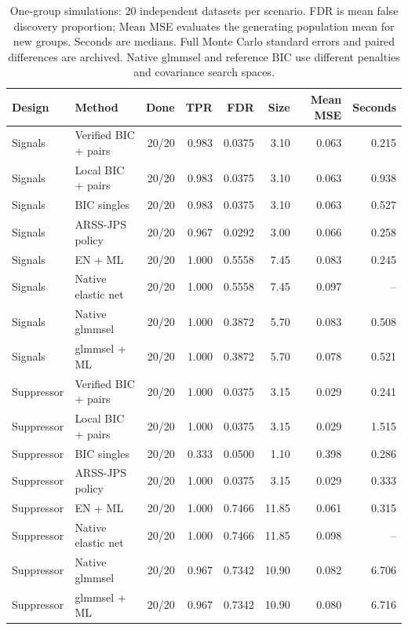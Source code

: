 \begin{table}[H]\centering\small
\begin{tabular}{llrrrrrr}\toprule
Design & Method & Done & TPR & FDR & Size & Mean MSE & Seconds\\\midrule
Signals & Verified BIC + pairs & 20/20 & 0.983 & 0.0375 & 3.10 & 0.063 & 0.215\\
Signals & Local BIC + pairs & 20/20 & 0.983 & 0.0375 & 3.10 & 0.063 & 0.938\\
Signals & BIC singles & 20/20 & 0.983 & 0.0375 & 3.10 & 0.063 & 0.527\\
Signals & ARSS-JPS policy & 20/20 & 0.967 & 0.0292 & 3.00 & 0.066 & 0.258\\
Signals & EN + ML & 20/20 & 1.000 & 0.5558 & 7.45 & 0.083 & 0.245\\
Signals & Native elastic net & 20/20 & 1.000 & 0.5558 & 7.45 & 0.097 & --\\
Signals & Native glmmsel & 20/20 & 1.000 & 0.3872 & 5.70 & 0.083 & 0.508\\
Signals & glmmsel + ML & 20/20 & 1.000 & 0.3872 & 5.70 & 0.078 & 0.521\\
\midrule
Suppressor & Verified BIC + pairs & 20/20 & 1.000 & 0.0375 & 3.15 & 0.029 & 0.241\\
Suppressor & Local BIC + pairs & 20/20 & 1.000 & 0.0375 & 3.15 & 0.029 & 1.515\\
Suppressor & BIC singles & 20/20 & 0.333 & 0.0500 & 1.10 & 0.398 & 0.286\\
Suppressor & ARSS-JPS policy & 20/20 & 1.000 & 0.0375 & 3.15 & 0.029 & 0.333\\
Suppressor & EN + ML & 20/20 & 1.000 & 0.7466 & 11.85 & 0.061 & 0.315\\
Suppressor & Native elastic net & 20/20 & 1.000 & 0.7466 & 11.85 & 0.098 & --\\
Suppressor & Native glmmsel & 20/20 & 0.967 & 0.7342 & 10.90 & 0.082 & 6.706\\
Suppressor & glmmsel + ML & 20/20 & 0.967 & 0.7342 & 10.90 & 0.080 & 6.716\\
\bottomrule\end{tabular}
\caption{One-group simulations: 20 independent datasets per scenario. FDR is mean false discovery proportion; Mean MSE evaluates the generating population mean for new groups. Seconds are medians. Full Monte Carlo standard errors and paired differences are archived. Native glmmsel and reference BIC use different penalties and covariance search spaces.}
\end{table}
